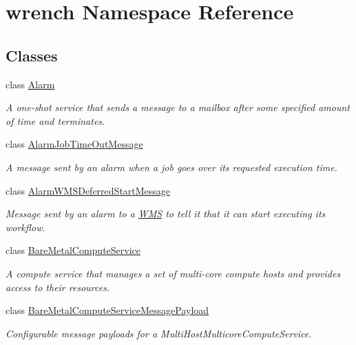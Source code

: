 \hypertarget{namespacewrench}{}\section{wrench Namespace Reference}
\label{namespacewrench}
\subsection*{Classes}
\begin{DoxyCompactItemize}
\item 
class \hyperlink{classwrench_1_1_alarm}{Alarm}
\begin{DoxyCompactList}\small\item\em A one-\/shot service that sends a message to a mailbox after some specified amount of time and terminates. \end{DoxyCompactList}\item 
class \hyperlink{classwrench_1_1_alarm_job_time_out_message}{Alarm\+Job\+Time\+Out\+Message}
\begin{DoxyCompactList}\small\item\em A message sent by an alarm when a job goes over its requested execution time. \end{DoxyCompactList}\item 
class \hyperlink{classwrench_1_1_alarm_w_m_s_deferred_start_message}{Alarm\+W\+M\+S\+Deferred\+Start\+Message}
\begin{DoxyCompactList}\small\item\em Message sent by an alarm to a \hyperlink{classwrench_1_1_w_m_s}{W\+MS} to tell it that it can start executing its workflow. \end{DoxyCompactList}\item 
class \hyperlink{classwrench_1_1_bare_metal_compute_service}{Bare\+Metal\+Compute\+Service}
\begin{DoxyCompactList}\small\item\em A compute service that manages a set of multi-\/core compute hosts and provides access to their resources. \end{DoxyCompactList}\item 
class \hyperlink{classwrench_1_1_bare_metal_compute_service_message_payload}{Bare\+Metal\+Compute\+Service\+Message\+Payload}
\begin{DoxyCompactList}\small\item\em Configurable message payloads for a Multi\+Host\+Multicore\+Compute\+Service. \end{DoxyCompactList}\item 

\end{DoxyCompactItemize}

